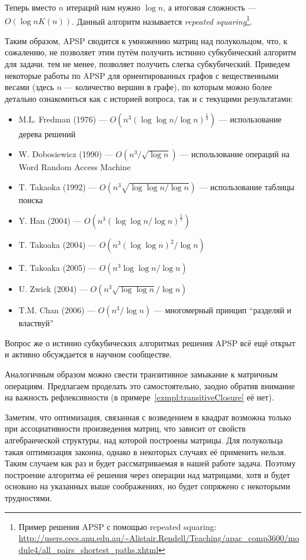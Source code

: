 Теперь вместо $n$ итераций нам нужно $\log{n}$, а итоговая сложность --- $O(\log{n} K(n))$.
Данный алгоритм называется \textit{repeated squaring}\footnote{Пример решения APSP с помощью repeated squaring: \url{http://users.cecs.anu.edu.au/~Alistair.Rendell/Teaching/apac_comp3600/module4/all_pairs_shortest_paths.xhtml}}.

Таким образом, APSP сводится к умножению матриц над полукольцом, что, к сожалению, не позволяет этим путём получить истинно субкубический алгоритм для задачи. тем не менее, позволяет получить слегка субкубический. Приведем некоторые работы по APSP для ориентированных графов с вещественными весами (здесь $n$ --- количество вершин в графе), по которым можно более детально ознакомиться как с историей вопроса, так и с текущими результатами:
\begin{itemize}
    \item M.L. Fredman (1976) --- $O(n^3(\log \log n / \log n)^\frac{1}{3})$ --- использование дерева решений~\cite{FredmanAPSP1976}
    \item W. Dobosiewicz (1990) --- $O(n^3 / \sqrt{\log n})$ --- использование операций на Word Random Access Machine~\cite{Dobosiewicz1990}
    \item T. Takaoka (1992) --- $O(n^3 \sqrt{\log \log n / \log n})$ --- использование таблицы поиска~\cite{Takaoka1992}
    \item Y. Han (2004) --- $O(n^3 (\log \log n / \log n)^\frac{5}{7})$~\cite{Han2004}
    \item T. Takoaka (2004) --- $O(n^3 (\log \log n)^2 / \log n)$~\cite{Takaoka2004}
    \item T. Takoaka (2005) --- $O(n^3 \log \log n / \log n)$~\cite{Takaoka2005}
    \item U. Zwick (2004) --- $O(n^3 \sqrt{\log \log n} / \log n)$~\cite{Zwick2004}
    \item T.M. Chan (2006) --- $O(n^3 / \log n)$ --- многомерный принцип ``разделяй и властвуй''~\cite{Chan2008}
\end{itemize}

Вопрос же о истинно субкубических алгоритмах решения APSP всё ещё открыт~\cite{Chan2010} и активно обсуждается в научном сообществе.

Аналогичным образом можно свести транзитивное замыкание к матричным операциям. Предлагаем проделать это самостоятельно, заодно обратив внимание на важность рефлексивности (в примере~\ref{exmpl:transitiveClosure} её нет).

Заметим, что оптимизация, связанная с возведением в квадрат возможна только при ассоциативности произведения матриц, что зависит от свойств алгебраической структуры, над которой построены матрицы. Для полукольца такая оптимизация законна, однако в некоторых случаях её применить нельзя. Таким случаем как раз и будет рассматриваемая в нашей работе задача. Поэтому построение алгоритма её решения через операции над матрицами, хотя и будет основано на указанных выше соображениях, но будет сопряжено с некоторыми трудностями. 



